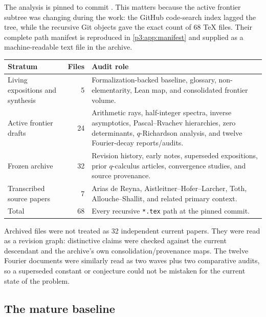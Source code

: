 \documentclass[11pt]{article}
\numberwithin{equation}{section}
\theoremstyle{definition}
\theoremstyle{remark}
\begin{document}
The analysis is pinned to commit \commitsha.  This matters because the active frontier
subtree was changing during the work: the GitHub code-search index lagged the tree, while the
recursive Git objects gave the exact count of 68 TeX files.  Their complete path manifest is
reproduced in \cref{p3:app:manifest} and supplied as a machine-readable text file in the
archive.

\begin{center}
\begin{tabularx}{\textwidth}{@{}l r X@{}}
\toprule
Stratum & Files & Audit role\\
\midrule
Living expositions and synthesis & 5 & Formalization-backed baseline, glossary,
non-elementarity, Lean map, and consolidated frontier volume.\\
Active frontier drafts & 24 & Arithmetic rays, half-integer spectra, inverse asymptotics,
Pascal--Rvachev hierarchies, zero determinants, $q$-Richardson analysis, and twelve
Fourier-decay reports/audits.\\
Frozen archive & 32 & Revision history, early notes, superseded expositions, prior
$q$-calculus articles, convergence studies, and source provenance.\\
Transcribed source papers & 7 & Arias de Reyna, Aistleitner--Hofer--Larcher, Toth,
Allouche--Shallit, and related primary context.\\
\midrule
Total & 68 & Every recursive \texttt{*.tex} path at the pinned commit.\\
\bottomrule
\end{tabularx}
\end{center}

Archived files were not treated as 32 independent current papers.  They were read as a
revision graph: distinctive claims were checked against the current descendant and the
archive's own consolidation/provenance maps.  The twelve Fourier documents were similarly
read as two waves plus two comparative audits, so a superseded constant or conjecture could
not be mistaken for the current state of the problem.

\subsection{The mature baseline}
\end{document}
